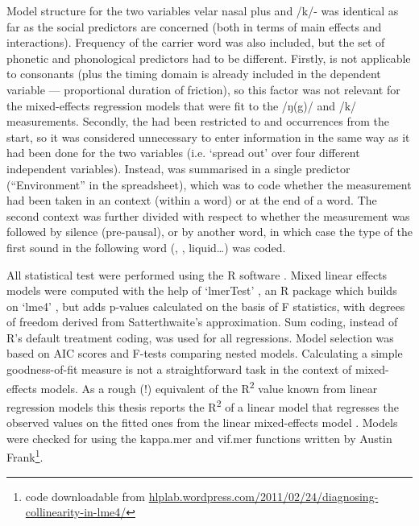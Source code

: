 Model structure for the two  variables velar nasal plus and /k/- was identical as far as the social predictors are concerned (both in terms of main effects and interactions).
Frequency of the carrier word was also included, but the set of phonetic and phonological predictors had to be different.
Firstly,  is not applicable to consonants (plus the timing domain is already included in the dependent variable --- proportional duration of friction), so this factor was not relevant for the mixed-effects regression models that were fit to the /ŋ(g)/ and /k/ measurements.
Secondly, the  had been restricted to  and  occurrences from the start, so it was considered unnecessary to enter information in the same way as it had been done for the two  variables (i.e. `spread out' over four different independent variables).
Instead,  was summarised in a single predictor (``Environment'' in the spreadsheet), which was to code whether the measurement had been taken in an  context (within a word) or at the end of a word.
The second context was further divided with respect to whether the measurement was followed by silence (pre-pausal), or by another word, in which case the type of the first sound in the following word (, , liquid\ldots) was coded.

All statistical test were performed using the R software \parencite{R}.
Mixed linear effects models were computed with the help of `lmerTest' \parencite{lmerTest}, an R package which builds on `lme4' \parencite{lme4}, but adds p-values calculated on the basis of F statistics, with degrees of freedom derived from Satterthwaite's approximation.
Sum coding, instead of R's default treatment coding, was used for all regressions.
Model selection was based on AIC scores and F-tests comparing nested models.
Calculating a simple goodness-of-fit measure is not a straightforward task in the context of mixed-effects models.
As a rough (!) equivalent of the R\textsuperscript{2} value known from linear regression models this thesis reports the R\textsuperscript{2} of a linear model that regresses the observed values on the fitted ones from the linear mixed-effects model \parencite[cf.][]{glmwiki}.
Models were checked for  using the kappa.mer and vif.mer
functions written by Austin Frank\footnote{code downloadable from \url{hlplab.wordpress.com/2011/02/24/diagnosing-collinearity-in-lme4/}}.